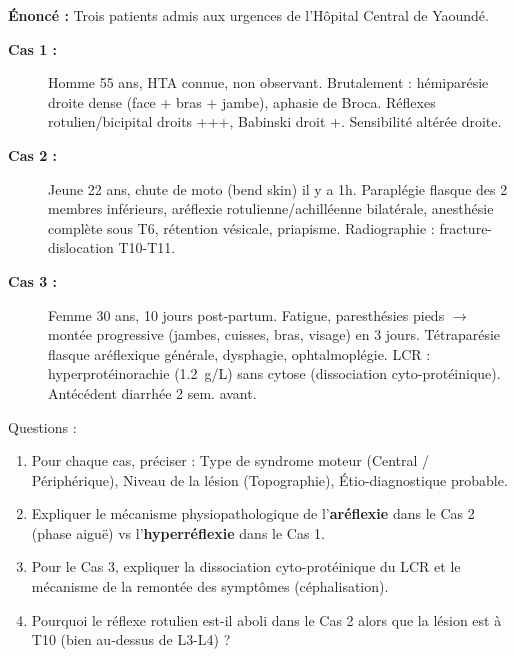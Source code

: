 \documentclass[11pt]{article}
\begin{document}
\begin{exoresolu}
\textbf{Énoncé :} Trois patients admis aux urgences de l'Hôpital Central de Yaoundé.
\begin{description}
    \item[\textbf{Cas 1 :}] Homme 55 ans, HTA connue, non observant. Brutalement : hémiparésie droite dense (face + bras + jambe), aphasie de Broca. Réflexes rotulien/bicipital droits +++, Babinski droit +. Sensibilité altérée droite.
    \item[\textbf{Cas 2 :}] Jeune 22 ans, chute de moto (bend skin) il y a 1h. Paraplégie flasque des 2 membres inférieurs, aréflexie rotulienne/achilléenne bilatérale, anesthésie complète sous T6, rétention vésicale, priapisme. Radiographie : fracture-dislocation T10-T11.
    \item[\textbf{Cas 3 :}] Femme 30 ans, 10 jours post-partum. Fatigue, paresthésies pieds $\rightarrow$ montée progressive (jambes, cuisses, bras, visage) en 3 jours. Tétraparésie flasque aréflexique générale, dysphagie, ophtalmoplégie. LCR : hyperprotéinorachie (\SI{1,2}{g/L}) sans cytose (dissociation cyto-protéinique). Antécédent diarrhée 2 sem. avant.
\end{description}
Questions :
\begin{enumerate}
    \item Pour chaque cas, préciser : Type de syndrome moteur (Central / Périphérique), Niveau de la lésion (Topographie), Étio-diagnostique probable.
    \item Expliquer le mécanisme physiopathologique de l'\textbf{aréflexie} dans le Cas 2 (phase aiguë) vs l'\textbf{hyperréflexie} dans le Cas 1.
    \item Pour le Cas 3, expliquer la dissociation cyto-protéinique du LCR et le mécanisme de la remontée des symptômes (céphalisation).
    \item Pourquoi le réflexe rotulien est-il aboli dans le Cas 2 alors que la lésion est à T10 (bien au-dessus de L3-L4) ?
\end{enumerate}


\end{exoresolu}
\end{document}

